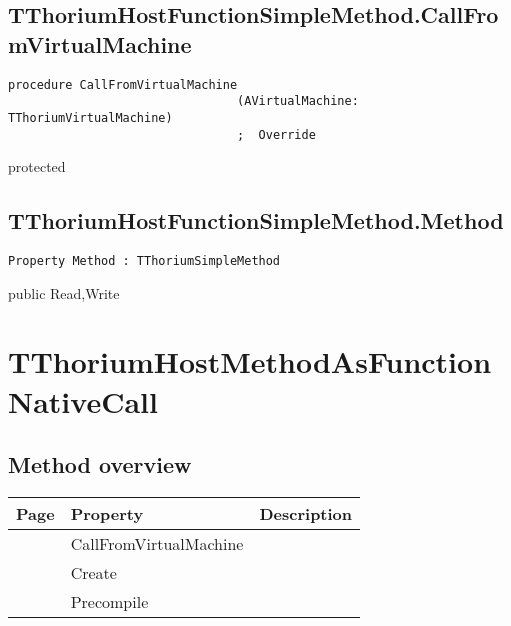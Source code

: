 \subsection{TThoriumHostFunctionSimpleMethod.CallFromVirtualMachine}
\label{thoriumcore:thorium:tthoriumhostfunctionsimplemethod:callfromvirtualmachine}
\begin{FPCList}
\Synopsis
\Declaration 

\begin{verbatim}
procedure CallFromVirtualMachine
                                (AVirtualMachine: TThoriumVirtualMachine)
                                ;  Override
\end{verbatim}
\Visibility
protected
\Description
\Errors
\end{FPCList}
\subsection{TThoriumHostFunctionSimpleMethod.Method}
\label{thoriumcore:thorium:tthoriumhostfunctionsimplemethod:method}
\begin{FPCList}
\Synopsis
\Declaration 

\begin{verbatim}
Property Method : TThoriumSimpleMethod
\end{verbatim}
\Visibility
public
\Access
Read,Write
\Description
\end{FPCList}
\section{TThoriumHostMethodAsFunctionNativeCall}
\label{thoriumcore:thorium:tthoriumhostmethodasfunctionnativecall}
\subsection{Method overview}
\label{thoriumcore:thorium:tthoriumhostmethodasfunctionnativecall:methods}
\begin{tabularx}{\textwidth}{llX}
Page & Property & Description  \\ \hline
\pageref{thoriumcore:thorium:tthoriumhostmethodasfunctionnativecall:callfromvirtualmachine} & CallFromVirtualMachine  &  \\
\pageref{thoriumcore:thorium:tthoriumhostmethodasfunctionnativecall:create} & Create  &  \\
\pageref{thoriumcore:thorium:tthoriumhostmethodasfunctionnativecall:precompile} & Precompile  &  \\
\hline
\end{tabularx}
